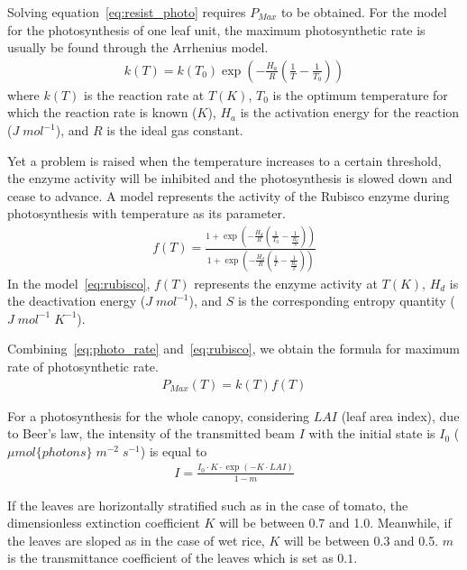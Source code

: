 \documentclass[a4paper]{article}
\begin{document}
Solving equation~\eqref{eq:resist_photo} requires \(P_{Max}\) to be obtained. For the model for the photosynthesis of one leaf unit, the maximum photosynthetic rate is usually be found through the Arrhenius model.
\begin{align}
  \label{eq:photo_rate}
  k(T) = k(T_0)\exp \left(-\frac{H_a}{R} \left(\frac{1}{T} - \frac{1}{T_0}\right)\right)
\end{align}
where \(k(T)\) is the reaction rate at \(T(K)\), \(T_0\) is the optimum temperature for which the reaction
rate is known (\(K\)), \(H_a\) is the activation energy for the reaction (\(J\;mol^{-1}\)), and \(R\) is the ideal gas constant.

Yet a problem is raised when the temperature increases to a certain threshold, the enzyme activity will be inhibited and the photosynthesis is slowed down and cease to advance. A model represents the activity of the Rubisco enzyme during photosynthesis with temperature as its parameter.
\begin{align}
  \label{eq:rubisco}
  f(T) = \frac{1 + \exp \left(-\frac{H_d}{R} \left(\frac{1}{T_0} - \frac{1}{\frac{H_d}{S}}\right)\right)}{1 + \exp \left(-\frac{H_d}{R}\left(\frac{1}{T} - \frac{1}{\frac{H_d}{S}}\right)\right)}
\end{align}
In the model~\eqref{eq:rubisco}, \(f(T)\) represents the enzyme activity at \(T(K)\), \(H_d\) is the deactivation energy (\(J\;mol^{-1}\)), and \(S\) is the corresponding entropy quantity (\(J\;mol^{-1}\;K^{-1}\)).

Combining~\eqref{eq:photo_rate} and~\eqref{eq:rubisco}, we obtain the formula for maximum rate of photosynthetic rate.
\begin{align}
  \label{eq:photo_max}
  P_{Max}(T) = k(T)f(T)
\end{align}

For a photosynthesis for the whole canopy, considering \(LAI\) (leaf area index), due to Beer's law, the intensity of the transmitted beam \(I\) with the initial state is \(I_0\) (\(\mu mol\{photons\}\;m^{-2}\;s^{-1}\)) is equal to
\begin{align}
  I = \frac{I_0 \cdot K \cdot \exp \left(-K \cdot LAI\right)}{1 - m}
\end{align}

If the leaves are horizontally stratified such as in the case of tomato, the dimensionless extinction coefficient \(K\) will be between 0.7 and 1.0. Meanwhile, if the leaves are sloped as in the case of wet rice, \(K\) will be between 0.3 and 0.5. \(m\) is the transmittance coefficient of the leaves which is set as \(0.1\).
\end{document}
